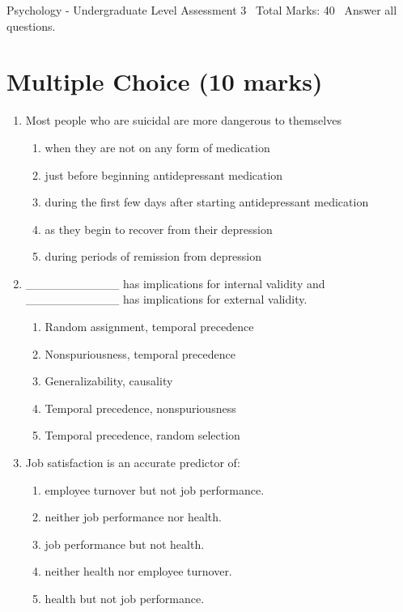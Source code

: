 \documentclass[12pt]{article}
\begin{document}
\begin{center}
Psychology - Undergraduate Level Assessment 3 \
Total Marks: 40 \
Answer all questions.
\end{center}

\section*{Multiple Choice (10 marks)}
\begin{enumerate}[label=\arabic*.]
\item Most people who are suicidal are more dangerous to themselves
\begin{enumerate}[label=(\alph*)]
    \item when they are not on any form of medication
    \item just before beginning antidepressant medication
    \item during the first few days after starting antidepressant medication
    \item as they begin to recover from their depression
    \item during periods of remission from depression
\end{enumerate}
\item \_\_\_\_\_\_\_\_\_\_\_ has implications for internal validity and \_\_\_\_\_\_\_\_\_\_\_ has implications for external validity.
\begin{enumerate}[label=(\alph*)]
    \item Random assignment, temporal precedence
    \item Nonspuriousness, temporal precedence
    \item Generalizability, causality
    \item Temporal precedence, nonspuriousness
    \item Temporal precedence, random selection
\end{enumerate}
\item Job satisfaction is an accurate predictor of:
\begin{enumerate}[label=(\alph*)]
    \item employee turnover but not job performance.
    \item neither job performance nor health.
    \item job performance but not health.
    \item neither health nor employee turnover.
    \item health but not job performance.
\end{enumerate}

\end{enumerate}
\end{document}
